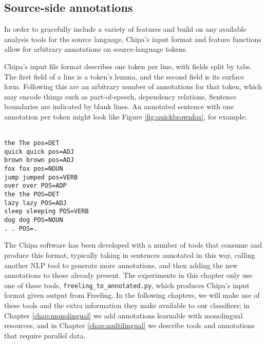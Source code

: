 \subsection{Source-side annotations}
\label{sec:annotations}
In order to gracefully include a variety of features and build on
any available analysis tools for the source language, Chipa's input format and
feature functions allow for arbitrary annotations on source-language tokens.

Chipa's input file format describes one token per line, with fields split by
tabs.  The first field of a line is a token's lemma, and the second field is
its surface form.  Following this are an arbitrary number of annotations for
that token, which may encode things such as part-of-speech, dependency
relations, Sentence boundaries are indicated by blank lines. An annotated
sentence with one annotation per token might look like Figure
\ref{fig:quickbrownfox}, for example:

\begin{figure*}
\raggedright \texttt{\\
the	The	pos=DET \\
quick	quick	pos=ADJ \\
brown	brown	pos=ADJ \\
fox	fox	pos=NOUN \\
jump	jumped	pos=VERB \\
over	over	POS=ADP \\
the	the	POS=DET \\
lazy	lazy	POS=ADJ \\
sleep sleeping	POS=VERB \\
dog	dog	POS=NOUN \\
.	.	POS=. \\
  }
  \caption{Example annotated sentence.}
  \label{fig:quickbrownfox}
\end{figure*}

The Chipa software has been developed with a number of tools that consume and
produce this format, typically taking in sentences annotated in this way,
calling another NLP tool to generate more annotations, and then adding the new
annotations to those already present. The experiments in this chapter only use
one of these tools, \texttt{freeling\_to\_annotated.py}, which produces Chipa's
input format given output from Freeling.  In the following chapters, we will
make use of these tools and the extra information they make available to our
classifiers; in Chapter \ref{chap:monolingual} we add annotations learnable with
monolingual resources, and in Chapter \ref{chap:multilingual} we describe tools
and annotations that require parallel data.

